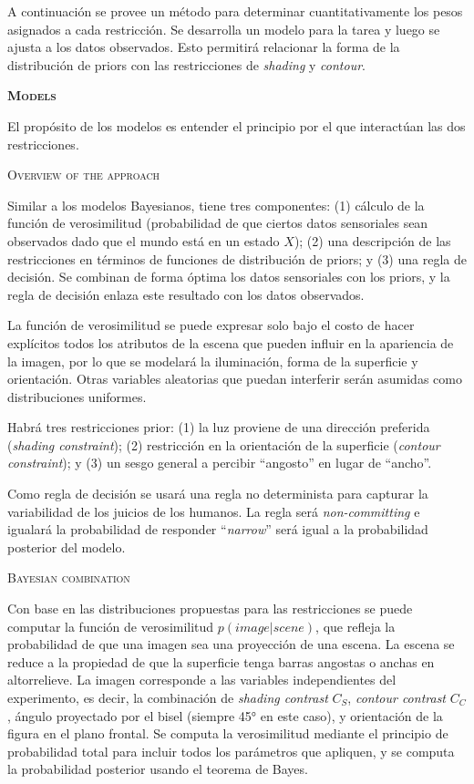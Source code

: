 \documentclass[a4paper,12pt]{article}
\begin{document}
A continuación se provee un método para determinar cuantitativamente los pesos asignados a cada restricción. Se desarrolla un modelo para la tarea y luego se ajusta a los datos observados. Esto permitirá relacionar la forma de la distribución de priors con las restricciones de {\itshape shading} y {\itshape contour}.

{\scshape\bfseries Models}

El propósito de los modelos es entender el principio por el que interactúan las dos restricciones. 

{\scshape Overview of the approach}

Similar a los modelos Bayesianos, tiene tres componentes: (1) cálculo de la función de verosimilitud (probabilidad de que ciertos datos sensoriales sean observados dado que el mundo está en un estado $X$); (2) una descripción de las restricciones en términos de funciones de distribución de priors; y (3) una regla de decisión. Se combinan de forma óptima los datos sensoriales con los priors, y la regla de decisión enlaza este resultado con los datos observados.

La función de verosimilitud se puede expresar solo bajo el costo de hacer explícitos todos los atributos de la escena que pueden influir en la apariencia de la imagen, por lo que se modelará la iluminación, forma de la superficie y orientación. Otras variables aleatorias que puedan interferir serán asumidas como distribuciones uniformes.

Habrá tres restricciones prior: (1) la luz proviene de una dirección preferida ({\itshape shading constraint}); (2) restricción en la orientación de la superficie ({\itshape contour constraint}); y (3) un sesgo general a percibir ``angosto'' en lugar de ``ancho''.

Como regla de decisión se usará una regla no determinista para capturar la variabilidad de los juicios de los humanos. La regla será {\itshape non-committing} e igualará la probabilidad de responder ``{\itshape narrow}'' será igual a la probabilidad posterior del modelo.

{\scshape Bayesian combination}

Con base en las distribuciones propuestas para las restricciones se puede computar la función de verosimilitud $p(image|scene)$, que refleja la probabilidad de que una imagen sea una proyección de una escena. La escena se reduce a la propiedad de que la superficie tenga barras angostas o anchas en altorrelieve. La imagen corresponde a las variables independientes del experimento, es decir, la combinación de {\itshape shading contrast} $C_{S}$, {\itshape contour contrast} $C_{C}$, ángulo proyectado por el bisel (siempre 45° en este caso), y orientación de la figura en el plano frontal. Se computa la verosimilitud mediante el principio de probabilidad total para incluir todos los parámetros que apliquen, y se computa la probabilidad posterior usando el teorema de Bayes.
\end{document}
